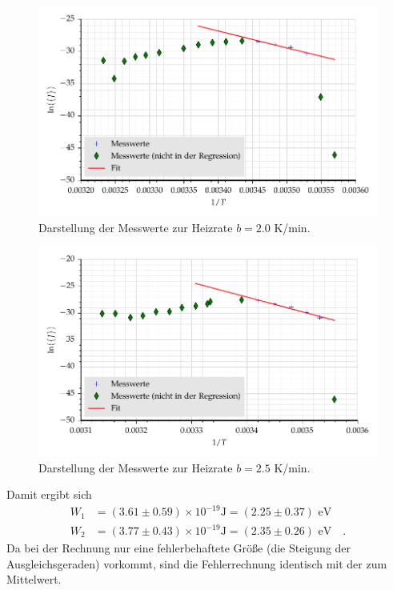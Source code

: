 \begin{figure}[h]
\centering
\includegraphics[scale=0.8]{../skript/G1.pdf}
\caption{Darstellung der Messwerte zur Heizrate $b=2.0$ K/min.}
\label{fig:G1}
\end{figure}
\begin{figure}[h]
\centering
\includegraphics[scale=0.8]{../skript/G2.pdf}
\caption{Darstellung der Messwerte zur Heizrate $b=2.5$ K/min.}
\label{fig:G2}
\end{figure}



Damit ergibt sich
\begin{align}
W_1&= (3.61 \pm 0.59)\times 10^{-19}\text{J}=(2.25 \pm 0.37)\text{ eV}\\
W_2&=  (3.77 \pm 0.43) \times 10^{-19}\text{J}=(2.35 \pm 0.26)\text{ eV}\quad .
\end{align}
Da bei der Rechnung nur eine fehlerbehaftete Größe (die Steigung der
Ausgleichsgeraden) vorkommt, sind die Fehlerrechnung identisch mit der
zum Mittelwert.
